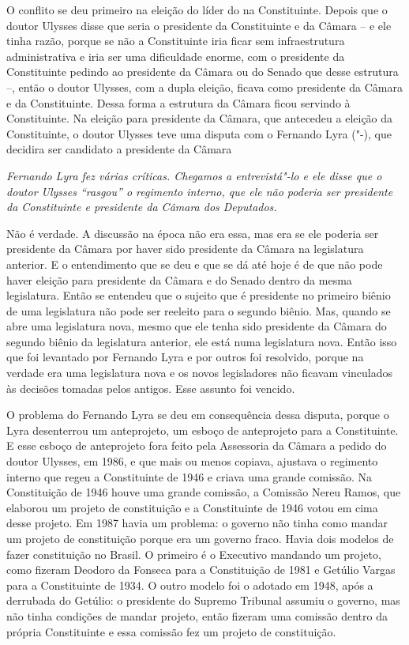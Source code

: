O conflito se deu primeiro na eleição do líder do  na Constituinte.
Depois que o doutor Ulysses disse que seria o presidente da Constituinte
e da Câmara -- e ele tinha razão, porque se não a Constituinte iria
ficar sem infraestrutura administrativa e iria ser uma dificuldade
enorme, com o presidente da Constituinte pedindo ao presidente da Câmara
ou do Senado que desse estrutura --, então o doutor Ulysses, com a dupla
eleição, ficava como presidente da Câmara e da Constituinte. Dessa forma
a estrutura da Câmara ficou servindo à Constituinte. Na eleição para
presidente da Câmara, que antecedeu a eleição da Constituinte, o doutor
Ulysses teve uma disputa com o Fernando Lyra ("-), que decidira ser
candidato a presidente da Câmara

\medskip

\noindent\emph{Fernando Lyra fez várias críticas. Chegamos a entrevistá"-lo e
ele disse que o doutor Ulysses ``rasgou'' o regimento interno, que ele não
poderia ser presidente da Constituinte e presidente da Câmara dos
Deputados.}

Não é verdade. A discussão na época não era essa, mas
era se ele poderia ser presidente da Câmara por haver sido presidente da
Câmara na legislatura anterior. E o entendimento que se deu e que se dá
até hoje é de que não pode haver eleição para presidente da Câmara e do
Senado dentro da mesma legislatura. Então se entendeu que o sujeito que
é presidente no primeiro biênio de uma legislatura não pode ser reeleito
para o segundo biênio. Mas, quando se abre uma legislatura nova, mesmo
que ele tenha sido presidente da Câmara do segundo biênio da legislatura
anterior, ele está numa legislatura nova. Então isso que foi levantado
por Fernando Lyra e por outros foi resolvido, porque na verdade era uma
legislatura nova e os novos legisladores não ficavam vinculados às
decisões tomadas pelos antigos. Esse assunto foi vencido.

O problema do Fernando Lyra se deu em consequência dessa disputa, porque
o Lyra desenterrou um anteprojeto, um esboço de anteprojeto para a
Constituinte. E esse esboço de anteprojeto fora feito pela Assessoria da
Câmara a pedido do doutor Ulysses, em 1986, e que mais ou menos copiava,
ajustava o regimento interno que regeu a Constituinte de 1946 e criava
uma grande comissão. Na Constituição de 1946 houve uma grande comissão,
a Comissão Nereu Ramos, que elaborou um projeto de constituição e a
Constituinte de 1946 votou em cima desse projeto. Em 1987 havia um
problema: o governo não tinha como mandar um projeto de constituição
porque era um governo fraco. Havia dois modelos de fazer constituição no
Brasil. O primeiro é o Executivo mandando um projeto, como fizeram
Deodoro da Fonseca para a Constituição de 1981 e Getúlio Vargas para a
Constituinte de 1934. O outro modelo foi o adotado em 1948, após a
derrubada do Getúlio: o presidente do Supremo Tribunal assumiu o
governo, mas não tinha condições de mandar projeto, então fizeram uma
comissão dentro da própria Constituinte e essa comissão fez um projeto
de constituição.

